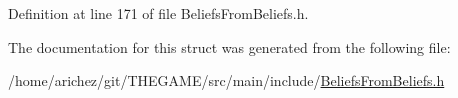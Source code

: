 Definition at line 171 of file Beliefs\-From\-Beliefs.\-h.



The documentation for this struct was generated from the following file\-:\begin{DoxyCompactItemize}
\item 
/home/arichez/git/\-T\-H\-E\-G\-A\-M\-E/src/main/include/\hyperlink{_beliefs_from_beliefs_8h}{Beliefs\-From\-Beliefs.\-h}\end{DoxyCompactItemize}
